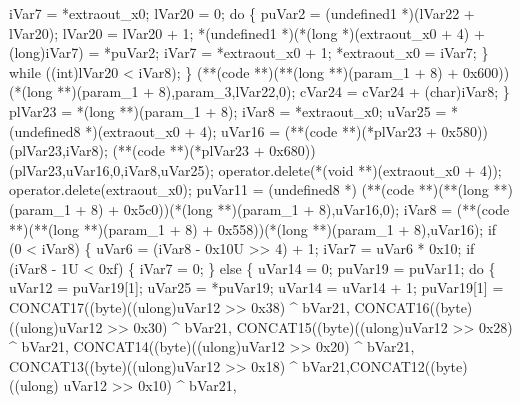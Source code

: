 \documentclass[
]{article}
\newenvironment{Shaded}{}{}
\newcommand{\NormalTok}[1]{#1}
\begin{document}
\begin{Shaded}
\begin{Highlighting}[]
\NormalTok{      iVar7 = *extraout\_x0;}
\NormalTok{      lVar20 = 0;}
\NormalTok{      do \{}
\NormalTok{        puVar2 = (undefined1 *)(lVar22 + lVar20);}
\NormalTok{        lVar20 = lVar20 + 1;}
\NormalTok{        *(undefined1 *)(*(long *)(extraout\_x0 + 4) + (long)iVar7) = *puVar2;}
\NormalTok{        iVar7 = *extraout\_x0 + 1;}
\NormalTok{        *extraout\_x0 = iVar7;}
\NormalTok{      \} while ((int)lVar20 \textless{} iVar8);}
\NormalTok{    \}}
\NormalTok{    (**(code **)(**(long **)(param\_1 + 8) + 0x600))(*(long **)(param\_1 + 8),param\_3,lVar22,0);}
\NormalTok{    cVar24 = cVar24 + (char)iVar8;}
\NormalTok{  \}}
\NormalTok{  plVar23 = *(long **)(param\_1 + 8);}
\NormalTok{  iVar8 = *extraout\_x0;}
\NormalTok{  uVar25 = *(undefined8 *)(extraout\_x0 + 4);}
\NormalTok{  uVar16 = (**(code **)(*plVar23 + 0x580))(plVar23,iVar8);}
\NormalTok{  (**(code **)(*plVar23 + 0x680))(plVar23,uVar16,0,iVar8,uVar25);}
\NormalTok{  operator.delete(*(void **)(extraout\_x0 + 4));}
\NormalTok{  operator.delete(extraout\_x0);}
\NormalTok{  puVar11 = (undefined8 *)}
\NormalTok{            (**(code **)(**(long **)(param\_1 + 8) + 0x5c0))(*(long **)(param\_1 + 8),uVar16,0);}
\NormalTok{  iVar8 = (**(code **)(**(long **)(param\_1 + 8) + 0x558))(*(long **)(param\_1 + 8),uVar16);}
\NormalTok{  if (0 \textless{} iVar8) \{}
\NormalTok{    uVar6 = (iVar8 {-} 0x10U \textgreater{}\textgreater{} 4) + 1;}
\NormalTok{    iVar7 = uVar6 * 0x10;}
\NormalTok{    if (iVar8 {-} 1U \textless{} 0xf) \{}
\NormalTok{      iVar7 = 0;}
\NormalTok{    \}}
\NormalTok{    else \{}
\NormalTok{      uVar14 = 0;}
\NormalTok{      puVar19 = puVar11;}
\NormalTok{      do \{}
\NormalTok{        uVar12 = puVar19[1];}
\NormalTok{        uVar25 = *puVar19;}
\NormalTok{        uVar14 = uVar14 + 1;}
\NormalTok{        puVar19[1] = CONCAT17((byte)((ulong)uVar12 \textgreater{}\textgreater{} 0x38) \^{} bVar21,}
\NormalTok{                              CONCAT16((byte)((ulong)uVar12 \textgreater{}\textgreater{} 0x30) \^{} bVar21,}
\NormalTok{                                       CONCAT15((byte)((ulong)uVar12 \textgreater{}\textgreater{} 0x28) \^{} bVar21,}
\NormalTok{                                                CONCAT14((byte)((ulong)uVar12 \textgreater{}\textgreater{} 0x20) \^{} bVar21,}
\NormalTok{                                                         CONCAT13((byte)((ulong)uVar12 \textgreater{}\textgreater{} 0x18) \^{}}
\NormalTok{                                                                  bVar21,CONCAT12((byte)((ulong)}
\NormalTok{                                                  uVar12 \textgreater{}\textgreater{} 0x10) \^{} bVar21,}

\end{Highlighting}
\end{Shaded}
\end{document}
